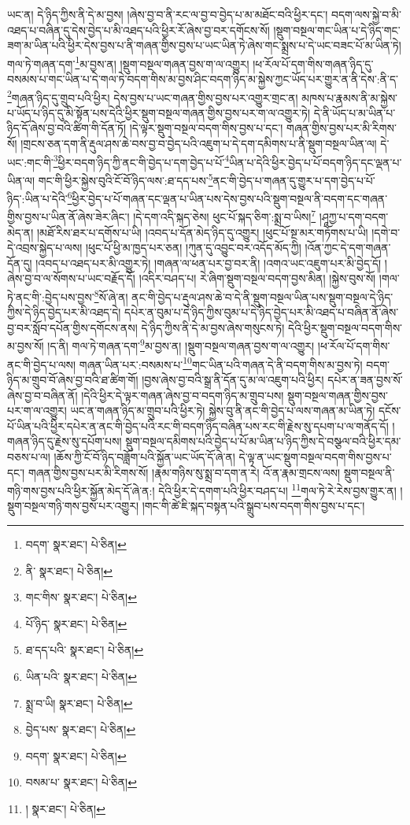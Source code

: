 ཡང་ན། དེ་ཉིད་ཀྱིས་ནི་དེ་མ་བྱས། །ཞེས་བྱ་བ་ནི་རང་ལ་བྱ་བ་བྱེད་པ་མ་མཐོང་བའི་ཕྱིར་དང་། བདག་ལས་སྐྱེ་བ་མི་འཐད་པ་བཞིན་དུ་དེས་བྱེད་པ་མི་འཐད་པའི་ཕྱིར་རོ་ཞེས་བྱ་བར་དགོངས་སོ། །སྡུག་བསྔལ་གང་ཡིན་པ་དེ་ཉིད་གང་ཟག་མ་ཡིན་པའི་ཕྱིར་དེས་བྱས་པ་ནི་གཞན་གྱིས་བྱས་པ་ཡང་ཡིན་ཏེ་ཞེས་གང་སྨྲས་པ་དེ་ཡང་བཟང་པོ་མ་ཡིན་ཏེ། གལ་ཏེ་གཞན་དག་\footnote{བདག་  སྣར་ཐང་།  པེ་ཅིན། }མ་བྱས་ན། །སྡུག་བསྔལ་གཞན་བྱས་ག་ལ་འགྱུར། །ཕ་རོལ་པོ་དག་གིས་གཞན་ཉིད་དུ་བསམས་པ་གང་ཡིན་པ་དེ་གལ་ཏེ་བདག་གིས་མ་བྱས་ཤིང་བདག་ཉིད་མ་སྐྱེས་ཀྱང་ཡོད་པར་གྱུར་ན་ནི་དེས་:ནི་ད་\footnote{ནི་  སྣར་ཐང་།  པེ་ཅིན། }གཞན་ཉིད་དུ་གྲུབ་པའི་ཕྱིར། དེས་བྱས་པ་ཡང་གཞན་གྱིས་བྱས་པར་འགྱུར་གྲང་ན། མཁས་པ་རྣམས་ནི་མ་སྐྱེས་པ་ཡོད་པ་ཉིད་དུ་མི་སྟོན་པས་དེའི་ཕྱིར་སྡུག་བསྔལ་གཞན་གྱིས་བྱས་པར་ག་ལ་འགྱུར་ཏེ། དེ་ནི་ཡོད་པ་མ་ཡིན་པ་ཉིད་དོ་ཞེས་བྱ་བའི་ཚིག་གི་དོན་ཏོ། །དེ་ལྟར་སྡུག་བསྔལ་བདག་གིས་བྱས་པ་དང་། གཞན་གྱིས་བྱས་པར་མི་རིགས་སོ། །གྲངས་ཅན་དག་ནི་རྡུལ་ཤས་ཆེ་བས་བྱ་བ་བྱེད་པའི་འཇུག་པ་དེ་དག་དམིགས་པ་ནི་སྡུག་བསྔལ་ཡིན་ལ། དེ་ཡང་:གང་གི་\footnote{གང་གིས་  སྣར་ཐང་།  པེ་ཅིན། }ཕྱིར་བདག་ཉིད་ཀྱི་ནང་གི་བྱེད་པ་དག་བྱེད་པ་པོ་\footnote{པོ་ཉིད་  སྣར་ཐང་།  པེ་ཅིན། }ཡིན་པ་དེའི་ཕྱིར་བྱེད་པ་པོ་བདག་ཉིད་དང་ལྡན་པ་ཡིན་ལ། གང་གི་ཕྱིར་སྐྱེས་བུའི་ངོ་བོ་ཉིད་ལས་:ཐ་དད་པས་\footnote{ཐ་དད་པའི་  སྣར་ཐང་།  པེ་ཅིན། }ནང་གི་བྱེད་པ་གཞན་དུ་གྱུར་པ་དག་བྱེད་པ་པོ་ཉིད་:ཡིན་པ་དེའི་\footnote{ཡིན་པའི་  སྣར་ཐང་།  པེ་ཅིན། }ཕྱིར་བྱེད་པ་པོ་གཞན་དང་ལྡན་པ་ཡིན་པས་དེས་བྱས་པའི་སྡུག་བསྔལ་ནི་བདག་དང་གཞན་གྱིས་བྱས་པ་ཡིན་ནོ་ཞེས་ཟེར་ཞིང་། །དེ་དག་འདི་སྐད་ཅེས། ཕུང་པོ་སྐད་ཅིག་:སྨྲ་བ་ཡིས།\footnote{སྨྲ་བ་ཡི།  སྣར་ཐང་།  པེ་ཅིན། } །ཤཱཀྱ་པ་དག་བདག་མེད་ན། །མཐོ་རིས་ཐར་པ་དགོས་པ་ཡི། །འབད་པ་དོན་མེད་ཉིད་དུ་འགྱུར། །ཕུང་པོ་སྔ་མར་གཏོགས་པ་ཡི། །དགེ་བ་དེ་འབྲས་སྐྱེད་པ་ལས། །ཕུང་པོ་ཕྱི་མ་ཁྱད་པར་ཅན། །ཀུན་དུ་འབྱུང་བར་འདོད་མོད་ཀྱི། །འོན་ཀྱང་དེ་དག་གཞན་དོན་དུ། །འབད་པ་འཐད་པར་མི་འགྱུར་ཏེ། །གཞན་ལ་ཕན་པར་བྱ་བར་ནི། །འགའ་ཡང་འཇུག་པར་མི་བྱེད་དོ། །ཞེས་བྱ་བ་ལ་སོགས་པ་ཡང་བརྗོད་དོ། །འདིར་བཤད་པ། རེ་ཞིག་སྡུག་བསྔལ་བདག་བྱས་མིན། །སྐྱེས་བུས་སོ། །གལ་ཏེ་ནང་གི་:བྱེད་པས་བྱས་\footnote{བྱེད་པས་  སྣར་ཐང་།  པེ་ཅིན། }སོ་ཞེ་ན། ནང་གི་བྱེད་པ་རྡུལ་ཤས་ཆེ་བ་དེ་ནི་སྡུག་བསྔལ་ཡིན་པས་སྡུག་བསྔལ་དེ་ཉིད་ཀྱིས་དེ་ཉིད་བྱེད་པར་མི་འཐད་དེ། དཔེར་ན་བུམ་པ་དེ་ཉིད་ཀྱིས་བུམ་པ་དེ་ཉིད་བྱེད་པར་མི་འཐད་པ་བཞིན་ནོ་ཞེས་བྱ་བར་སློབ་དཔོན་གྱིས་དགོངས་ནས། དེ་ཉིད་ཀྱིས་ནི་དེ་མ་བྱས་ཞེས་གསུངས་ཏེ། དེའི་ཕྱིར་སྡུག་བསྔལ་བདག་གིས་མ་བྱས་སོ། །ད་ནི། གལ་ཏེ་གཞན་དག་\footnote{བདག་  སྣར་ཐང་།  པེ་ཅིན། }མ་བྱས་ན། །སྡུག་བསྔལ་གཞན་བྱས་ག་ལ་འགྱུར། །ཕ་རོལ་པོ་དག་གིས་ནང་གི་བྱེད་པ་ལས། གཞན་ཡིན་པར་:བསམས་པ་\footnote{བསམ་པ་  སྣར་ཐང་།  པེ་ཅིན། }གང་ཡིན་པའི་གཞན་དེ་ནི་བདག་གིས་མ་བྱས་ཏེ། བདག་ཉིད་མ་གྲུབ་བོ་ཞེས་བྱ་བའི་ཐ་ཚིག་གོ། །བྱས་ཞེས་བྱ་བའི་སྒྲ་ནི་དོན་དུ་མ་ལ་འཇུག་པའི་ཕྱིར། དཔེར་ན་ཟན་བྱས་སོ་ཞེས་བྱ་བ་བཞིན་ནོ། །དེའི་ཕྱིར་དེ་ལྟར་གཞན་ཞེས་བྱ་བ་བདག་ཉིད་མ་གྲུབ་པས། སྡུག་བསྔལ་གཞན་གྱིས་བྱས་པར་ག་ལ་འགྱུར། ཡང་ན་གཞན་ཉིད་མ་གྲུབ་པའི་ཕྱིར་ཏེ། སྐྱེས་བུ་ནི་ནང་གི་བྱེད་པ་ལས་གཞན་མ་ཡིན་ཏེ། དངོས་པོ་ཡིན་པའི་ཕྱིར་དཔེར་ན་ནང་གི་བྱེད་པའི་རང་གི་བདག་ཉིད་བཞིན་པས་རང་གི་རྗེས་སུ་དཔག་པ་ལ་གནོད་དོ། །གཞན་ཉིད་དུ་རྗེས་སུ་དཔོག་པས། སྡུག་བསྔལ་དམིགས་པའི་བྱེད་པ་པོ་མ་ཡིན་པ་ཉིད་ཀྱིས་དེ་བསྩལ་བའི་ཕྱིར་དམ་བཅས་པ་ལ། །ཆོས་ཀྱི་ངོ་བོ་ཉིད་བཟློག་པའི་སྐྱོན་ཡང་ཡོད་དོ་ཞེ་ན། དེ་ལྟ་ན་ཡང་སྡུག་བསྔལ་བདག་གིས་བྱས་པ་དང་། གཞན་གྱིས་བྱས་པར་མི་རིགས་སོ། །རྣམ་གཉིས་སུ་སྨྲ་བ་དག་ན་རེ། འོ་ན་རྣམ་གྲངས་ལས། སྡུག་བསྔལ་ནི་གཉི་གས་བྱས་པའི་ཕྱིར་སྐྱོན་མེད་དོ་ཞེ་ན:། དེའི་ཕྱིར་དེ་དགག་པའི་ཕྱིར་བཤད་པ། \footnote{།    སྣར་ཐང་།  པེ་ཅིན། }གལ་ཏེ་རེ་རེས་བྱས་གྱུར་ན། །སྡུག་བསྔལ་གཉི་གས་བྱས་པར་འགྱུར། །གང་གི་ཚེ་ཇི་སྐད་བསྟན་པའི་སྒྲུབ་པས་བདག་གིས་བྱས་པ་དང་། 